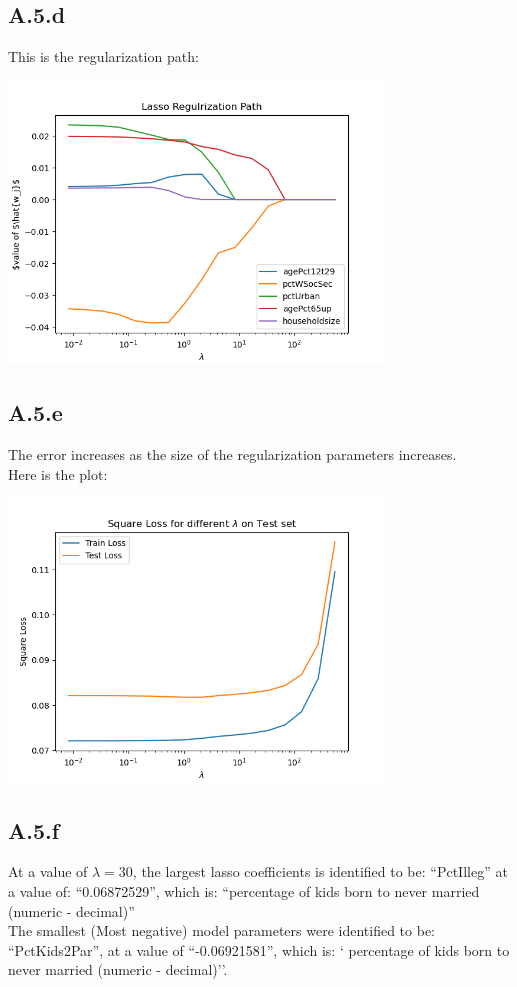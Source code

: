 \documentclass[]{article}
\begin{document}
    \subsection*{A.5.d}
        This is the regularization path: 
        \begin{center}
            \includegraphics[width=10cm]{A5d-plot.png}
        \end{center}
    \subsection*{A.5.e}
        The error increases as the size of the regularization parameters increases. 
        \\
        Here is the plot: 
        \begin{center}
            \includegraphics[width=10cm]{A5e-plot.png}
        \end{center}
    \subsection*{A.5.f} 
        At a value of $\lambda = 30$, the largest lasso coefficients is identified to be: ``PctIlleg'' at a value of:  ``0.06872529'', which is: ``percentage of kids born to never married (numeric - decimal)''
        \\
        The smallest (Most negative) model parameters were identified to be: ``PctKids2Par'', at a value of  ``-0.06921581'', which is: ` percentage of kids born to never married (numeric - decimal)''. 
\end{document}
